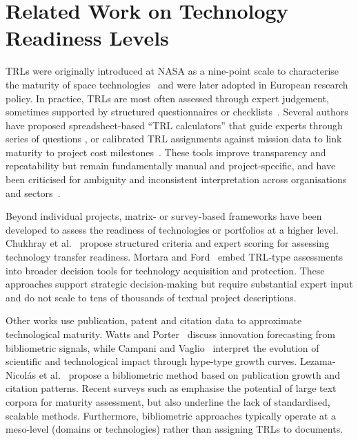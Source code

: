\documentclass[runningheads]{llncs}
\begin{document}
\section{Related Work on Technology Readiness Levels}

TRLs were originally introduced at NASA as a nine-point scale to characterise
the maturity of space technologies~\cite{mankins1995} and were later adopted in
European research policy. In practice, TRLs are most often assessed through
expert judgement, sometimes supported by structured questionnaires or
checklists~\cite{engel2012}. Several authors have proposed spreadsheet-based
``TRL calculators'' that guide experts through series of questions
\cite{nolte2008,nolte2003}, or calibrated TRL assignments against mission data
to link maturity to project cost milestones~\cite{terrile2015}. These tools
improve transparency and repeatability but remain fundamentally manual and
project-specific, and have been criticised for ambiguity and inconsistent
interpretation across organisations and sectors~\cite{olechowski2020}.

Beyond individual projects, matrix- or survey-based frameworks have been
developed to assess the readiness of technologies or portfolios at a higher
level. Chukhray et al.~\cite{chukhray2020} propose structured criteria and expert scoring for
assessing technology transfer readiness. Mortara and Ford~\cite{MortaraFord2012}
embed TRL-type assessments into broader decision tools for technology
acquisition and protection. These approaches support strategic decision-making
but require substantial expert input and do not scale to tens of
thousands of textual project descriptions.

Other works use publication, patent and citation data to
approximate technological maturity. Watts and Porter~\cite{wattsporter1997}
discuss innovation forecasting from bibliometric signals, while Campani and
Vaglio~\cite{campanivaglio2015} interpret the evolution of scientific and
technological impact through hype-type growth curves. Lezama-Nicolás et
al.~\cite{lezamanicolas2018} propose a bibliometric method based on publication
growth and citation patterns. Recent surveys such as \cite{loginova2025}
emphasise the potential of large text corpora for maturity assessment, but also
underline the lack of standardised, scalable methods. Furthermore, bibliometric
approaches typically operate at a meso-level (domains or technologies) rather
than assigning TRLs to documents.
\end{document}
